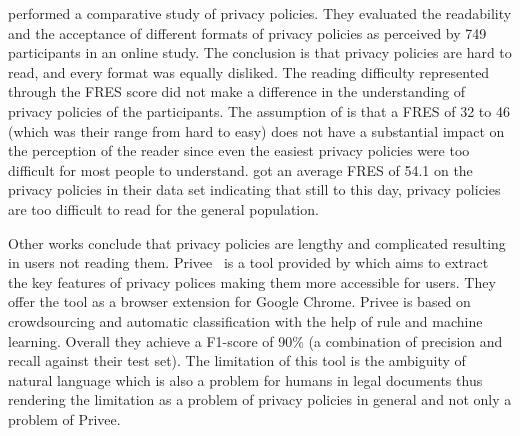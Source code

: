  performed a comparative study of privacy policies. They evaluated the readability and the
acceptance of different formats of privacy policies as perceived by 749 participants in an online study. The conclusion
is that privacy policies are hard to read, and every format was equally disliked. The reading difficulty represented
through the FRES score did not make a difference in the understanding of privacy policies of the participants.
The assumption of \citeauthor{mcdonald2009comparative} is that a FRES of 32
to 46 (which was their range from hard to easy) does not have a substantial impact on the perception of the reader since even the easiest
privacy policies were too difficult for most people to understand. \citeauthor{sanchez2019can} got an average FRES of
54.1 on the privacy policies in their data set indicating that still to this day, privacy policies are too difficult
to read for the general population.

Other works conclude that privacy policies are lengthy and complicated resulting in users not reading them.
Privee~\cite{zimmeck2014privee} is a tool provided by
\citeauthor{zimmeck2014privee} which aims to extract the key features of privacy polices making them more
accessible for users. They offer the tool as a browser extension for Google Chrome. Privee is based on crowdsourcing and
automatic classification with the help of rule and machine learning. Overall they achieve a F1-score of 90\% (a
combination of precision and recall against their test set).
The limitation of this tool is the ambiguity of natural language which is also a problem for humans in legal documents thus
rendering the limitation as a problem of privacy policies in general and not only a problem of Privee.

